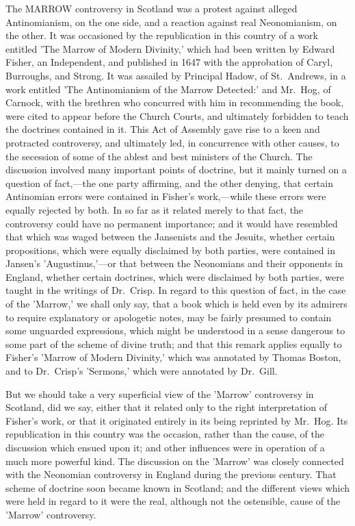 \documentclass[
]{book}
\begin{document}
The MARROW controversy in Scotland was a protest against alleged Antinomianism, on the one side, and a reaction against real Neonomianism, on the other. It was occasioned by the republication in this country of a work entitled 'The Marrow of Modern Divinity,' which had been written by Edward Fisher, an Independent, and published in 1647 with the approbation of Caryl, Burroughs, and Strong. It was assailed by Principal Hadow, of St.~Andrews, in a work entitled 'The Antinomianism of the Marrow Detected:' and Mr.~Hog, of Carnock, with the brethren who concurred with him in recommending the book, were cited to appear before the Church Courts, and ultimately forbidden to teach the doctrines contained in it. This Act of Assembly gave rise to a keen and protracted controversy, and ultimately led, in concurrence with other causes, to the secession of some of the ablest and best ministers of the Church. The discussion involved many important points of doctrine, but it mainly turned on a question of fact,---the one party affirming, and the other denying, that certain Antinomian errors were contained in Fisher's work,---while these errors were equally rejected by both. In so far as it related merely to that fact, the controversy could have no permanent importance; and it would have resembled that which was waged between the Jansenists and the Jesuits, whether certain propositions, which were equally disclaimed by both parties, were contained in Jansen's 'Augustinus,'---or that between the Neonomians and their opponents in England, whether certain doctrines, which were disclaimed by both parties, were taught in the writings of Dr.~Crisp. In regard to this question of fact, in the case of the 'Marrow,' we shall only say, that a book which is held even by its admirers to require explanatory or apologetic notes, may be fairly presumed to contain some unguarded expressions, which might be understood in a sense dangerous to some part of the scheme of divine truth; and that this remark applies equally to Fisher's 'Marrow of Modern Divinity,' which was annotated by Thomas Boston, and to Dr.~Crisp's 'Sermons,' which were annotated by Dr.~Gill.

But we should take a very superficial view of the 'Marrow' controversy in Scotland, did we say, either that it related only to the right interpretation of Fisher's work, or that it originated entirely in its being reprinted by Mr.~Hog. Its republication in this country was the occasion, rather than the cause, of the discussion which ensued upon it; and other influences were in operation of a much more powerful kind. The discussion on the 'Marrow' was closely connected with the Neonomian controversy in England during the previous century. That scheme of doctrine soon became known in Scotland; and the different views which were held in regard to it were the real, although not the ostensible, cause of the 'Marrow' controversy.
\end{document}
